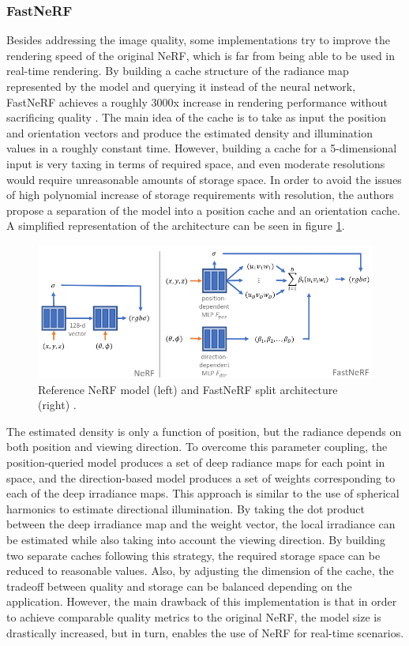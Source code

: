 \subsubsection{FastNeRF}
Besides addressing the image quality, some implementations try to improve the rendering speed of the original NeRF, which is far from being able to be used in real-time rendering. By building a cache structure of the radiance map represented by the model and querying it instead of the neural network, FastNeRF achieves a roughly 3000x increase in rendering performance without sacrificing quality \cite{garbin2021fastnerf}. The main idea of the cache is to take as input the position and orientation vectors and produce the estimated density and illumination values in a roughly constant time. However, building a cache for a 5-dimensional input is very taxing in terms of required space, and even moderate resolutions would require unreasonable amounts of storage space. In order to avoid the issues of high polynomial increase of storage requirements with resolution, the authors propose a separation of the model into a position cache and an orientation cache.  A simplified representation of the architecture can be seen in figure \ref{fig:fastnerf}.

\begin{figure}[H]
    \centering
    \includegraphics[width=0.6\linewidth]{figures/fastnerf.png}
    \caption{Reference NeRF model (left) and FastNeRF split architecture (right) \cite{garbin2021fastnerf}.}
    \label{fig:fastnerf}
\end{figure}

The estimated density is only a function of position, but the radiance depends on both position and viewing direction. To overcome this parameter coupling, the position-queried model produces a set of deep radiance maps for each point in space, and the direction-based model produces a set of weights corresponding to each of the deep irradiance maps. This approach is similar to the use of spherical harmonics to estimate directional illumination. By taking the dot product between the deep irradiance map and the weight vector, the local irradiance can be estimated while also taking into account the viewing direction. By building two separate caches following this strategy, the required storage space can be reduced to reasonable values. Also, by adjusting the dimension of the cache, the tradeoff between quality and storage can be balanced depending on the application. However, the main drawback of this implementation is that in order to achieve comparable quality metrics to the original NeRF, the model size is drastically increased, but in turn, enables the use of NeRF for real-time scenarios. 

